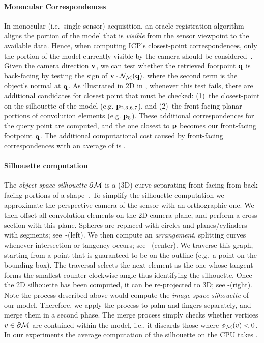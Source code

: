 \paragraph{Monocular Correspondences}
In monocular (i.e.\ single sensor) acquisition, an oracle registration algorithm aligns the portion of the model that is \emph{visible} from the sensor viewpoint to the available data. Hence, when computing ICP's closest-point correspondences, only the portion of the model currently visible by the camera should be considered~\cite{tagliasacchi2015robust}. Given the camera direction $\mathbf{v}$, we can test whether the retrieved footpoint $\mathbf{q}$ is back-facing by testing the sign of $\mathbf{v} \cdot \mathcal{N}_{\mathcal{M}}(\mathbf{q})$, where the second term is the object's normal at $\mathbf{q}$. As illustrated in 2D in , whenever this test fails, there are additional candidates for closest point that must be checked: (1)~the closest-point on the silhouette of the model (e.g. $\mathbf{p}_{2,3,6,7}$), and (2)~the front facing planar portions of convolution elements (e.g. $\mathbf{p}_{5}$). These additional correspondences for the query point are computed, and the one closest to $\mathbf{p}$ becomes our front-facing footpoint $\mathbf{q}$. The additional computational cost caused by front-facing correspondences with an average of  is .

\paragraph{Silhouette computation}
The \emph{object-space silhouette} $\partial \mathcal{M}$ is a (3D) curve separating front-facing from back-facing portions of a shape~\cite[Sec.1]{olson2006eg}. To simplify the silhouette computation we approximate the perspective camera of the sensor with an orthographic one. We then offset all convolution elements on the 2D camera plane, and perform a cross-section with this plane. Spheres are replaced with circles and planes/cylinders with segments; see~-(left). We then compute an \emph{arrangement}, splitting curves whenever intersection or tangency occurs; see~-(center). We traverse this graph, starting from a point that is guaranteed to be on the outline (e.g.\ a point on the bounding box). The traversal selects the next element as the one whose tangent forms the smallest counter-clockwise angle thus identifying the silhouette. Once the 2D silhouette has been computed, it can be re-projected to 3D; see -(right). Note the process described above would compute the \emph{image-space silhouette} of our model. Therefore, we apply the process to palm and fingers separately, and merge them in a second phase. The merge process simply checks whether vertices $v \in \partial \mathcal{M}$ are contained within the model, i.e., it discards those where $\phi_{\mathcal{M}}(v)<0$. In our experiments the average computation of the silhouette on the CPU takes .

